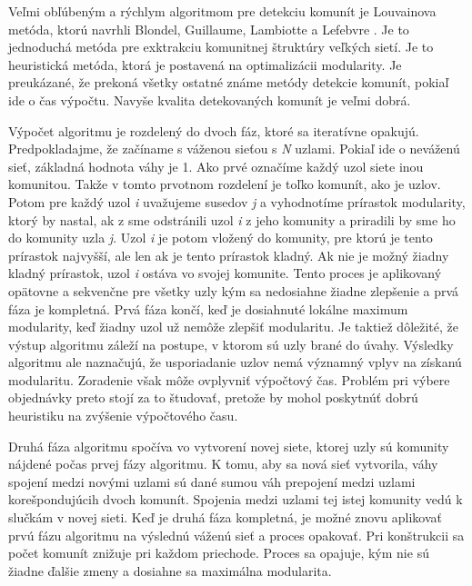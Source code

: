 \documentclass[slovak,master,public,dept460,male,cpdeclaration,oneside]{diploma}
\begin{document}
Veľmi obľúbeným a rýchlym algoritmom pre detekciu komunít je Louvainova metóda, ktorú navrhli Blondel, Guillaume, Lambiotte a Lefebvre \cite{12}. Je to jednoduchá metóda pre exktrakciu komunitnej štruktúry veľkých sietí. Je to heuristická metóda, ktorá je postavená na optimalizácii modularity. Je preukázané, že prekoná všetky ostatné známe metódy detekcie komunít, pokiaľ ide o čas výpočtu. Navyše kvalita detekovaných komunít je veľmi dobrá.


Výpočet algoritmu je rozdelený do dvoch fáz, ktoré sa iteratívne opakujú. Predpokladajme, že začíname s váženou sieťou s \textit{N} uzlami. Pokiaľ ide o neváženú sieť, základná hodnota váhy je 1. Ako prvé označíme každý uzol siete inou komunitou. Takže v tomto prvotnom rozdelení je toľko komunít, ako je uzlov. Potom pre každý uzol \textit{i} uvažujeme susedov \textit{j} a vyhodnotíme prírastok modularity, ktorý by nastal, ak z sme odstránili uzol \textit{i} z jeho komunity a priradili by sme ho do komunity uzla \textit{j}. Uzol \textit{i} je potom vložený do komunity, pre ktorú je tento prírastok najvyšší, ale len ak je tento prírastok kladný. Ak nie je možný žiadny kladný prírastok, uzol \textit{i} ostáva vo svojej komunite. Tento proces je aplikovaný opätovne a sekvenčne pre všetky uzly kým sa nedosiahne žiadne zlepšenie a prvá fáza je kompletná. Prvá fáza končí, keď je dosiahnuté lokálne maximum modularity, keď žiadny uzol už nemôže zlepšiť modularitu. Je taktiež dôležité, že výstup algoritmu záleží na postupe, v ktorom sú uzly brané do úvahy. Výsledky algoritmu ale naznačujú, že usporiadanie uzlov nemá významný vplyv na získanú modularitu. Zoradenie však môže ovplyvniť výpočtový čas. Problém pri výbere objednávky preto stojí za to študovať, pretože by mohol poskytnúť dobrú heuristiku na zvýšenie výpočtového času.


Druhá fáza algoritmu spočíva vo vytvorení novej siete, ktorej uzly sú komunity nájdené počas prvej fázy algoritmu. K tomu, aby sa nová sieť vytvorila, váhy spojení medzi novými uzlami sú dané sumou váh prepojení medzi uzlami korešpondujúcih dvoch komunít. Spojenia medzi uzlami tej istej komunity vedú k slučkám v novej sieti. Keď je druhá fáza kompletná, je možné znovu aplikovať prvú fázu algoritmu na výslednú váženú sieť a proces opakovať. Pri konštrukcii sa počet komunít znižuje pri každom priechode. Proces sa opajuje, kým nie sú žiadne ďalšie zmeny a dosiahne sa maximálna modularita.
\end{document}
